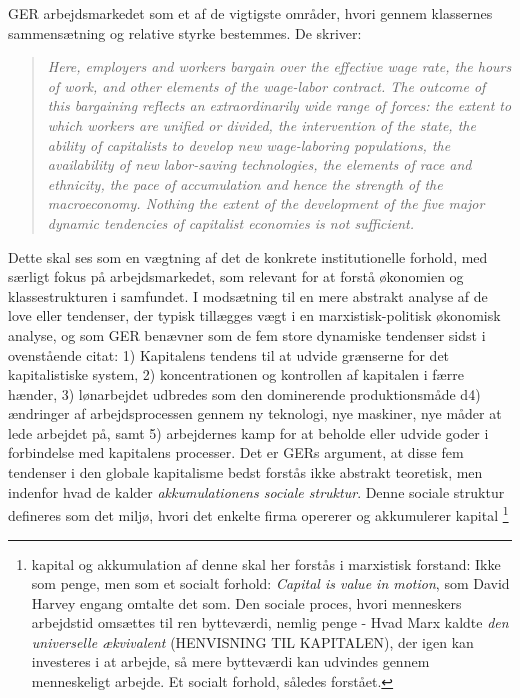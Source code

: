 GER arbejdsmarkedet som et af de vigtigste områder, hvori gennem klassernes sammensætning og relative styrke bestemmes. De skriver:
%
\begin{quote} \small %
\emph{Here, employers and workers bargain over the effective wage rate, the hours of work, and other elements of the wage-labor contract. The outcome of this bargaining reflects an extraordinarily wide range of forces: the extent to which workers are unified or divided, the intervention of the state, the ability of capitalists to develop new wage-laboring populations, the availability of new labor-saving technologies, the elements of race and ethnicity, the pace of accumulation and hence the strength of the macroeconomy. Nothing the extent of the development of the five major dynamic tendencies of capitalist economies is not sufficient.} 
\end{quote}
%
Dette skal ses som en vægtning af det de konkrete institutionelle forhold, med særligt fokus på arbejdsmarkedet, som relevant for at forstå økonomien og klassestrukturen i samfundet. I modsætning til en mere abstrakt analyse af de love eller tendenser, der typisk tillægges vægt i en marxistisk-politisk økonomisk analyse, og som GER benævner som de fem store dynamiske tendenser sidst i ovenstående citat: \label{kapitalakkumulation} 1) Kapitalens tendens til at udvide grænserne for det kapitalistiske system, 2) koncentrationen og kontrollen af kapitalen i færre hænder, 3) lønarbejdet udbredes som den dominerende produktionsmåde d4) ændringer af arbejdsprocessen gennem ny teknologi, nye maskiner, nye måder at lede arbejdet på, samt  5) arbejdernes kamp for at beholde eller udvide goder i forbindelse med kapitalens processer. %
Det er GERs argument, at disse fem tendenser i den globale kapitalisme bedst forstås ikke abstrakt teoretisk, men indenfor hvad de kalder \emph{akkumulationens sociale struktur}. Denne sociale struktur defineres som det miljø, hvori det enkelte firma opererer og akkumulerer kapital%
%
\footnote{kapital og akkumulation af denne skal her forstås i marxistisk forstand: Ikke som penge, men som et socialt forhold: \emph{Capital is value in motion}, som David Harvey engang omtalte det som. Den sociale proces, hvori menneskers arbejdstid omsættes til ren bytteværdi, nemlig penge - Hvad Marx kaldte \emph{den universelle ækvivalent} (HENVISNING TIL KAPITALEN), der igen kan investeres i at arbejde, så mere bytteværdi kan udvindes gennem menneskeligt arbejde. Et socialt forhold, således forstået.}%
